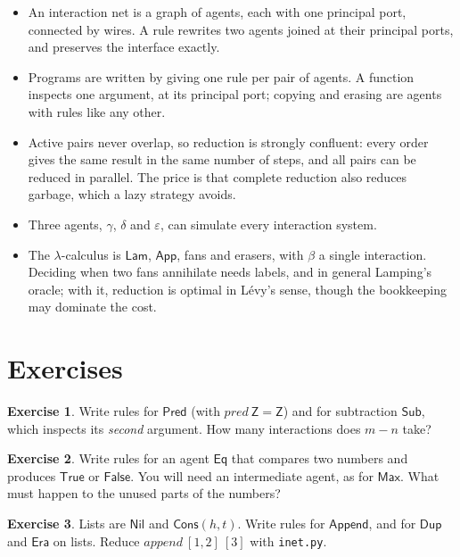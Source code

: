 \documentclass[11pt,a4paper]{article}
\newcommand{\ag}[1]{\mathsf{#1}}
\newcommand{\Z}{\ag{Z}}
\newcommand{\Lam}{\ag{Lam}}
\newcommand{\App}{\ag{App}}
\theoremstyle{definition}
\newtheorem{exercise}{Exercise}
\theoremstyle{plain}
\begin{document}
\begin{itemize}[itemsep=2pt]
\item An interaction net is a graph of agents, each with one principal port,
  connected by wires. A rule rewrites two agents joined at their principal
  ports, and preserves the interface exactly.
\item Programs are written by giving one rule per pair of agents. A function
  inspects one argument, at its principal port; copying and erasing are
  agents with rules like any other.
\item Active pairs never overlap, so reduction is strongly confluent: every
  order gives the same result in the same number of steps, and all pairs can
  be reduced in parallel. The price is that complete reduction also reduces
  garbage, which a lazy strategy avoids.
\item Three agents, $\gamma$, $\delta$ and $\varepsilon$, can simulate every
  interaction system.
\item The $\lambda$-calculus is $\Lam$, $\App$, fans and erasers, with
  $\beta$ a single interaction. Deciding when two fans annihilate needs
  labels, and in general Lamping's oracle; with it, reduction is optimal in
  Lévy's sense, though the bookkeeping may dominate the cost.
\end{itemize}

\section*{Exercises}

\begin{exercise}
Write rules for $\ag{Pred}$ (with $\mathit{pred}\ \Z = \Z$) and for
subtraction $\ag{Sub}$, which inspects its \emph{second} argument. How many
interactions does $m - n$ take?
\end{exercise}

\begin{exercise}
Write rules for an agent $\ag{Eq}$ that compares two numbers and produces
$\ag{True}$ or $\ag{False}$. You will need an intermediate agent, as for
$\ag{Max}$. What must happen to the unused parts of the numbers?
\end{exercise}

\begin{exercise}
Lists are $\ag{Nil}$ and $\ag{Cons}(h,t)$. Write rules for $\ag{Append}$,
and for $\ag{Dup}$ and $\ag{Era}$ on lists. Reduce
$\mathit{append}\ [1,2]\ [3]$ with \texttt{inet.py}.
\end{exercise}
\end{document}
